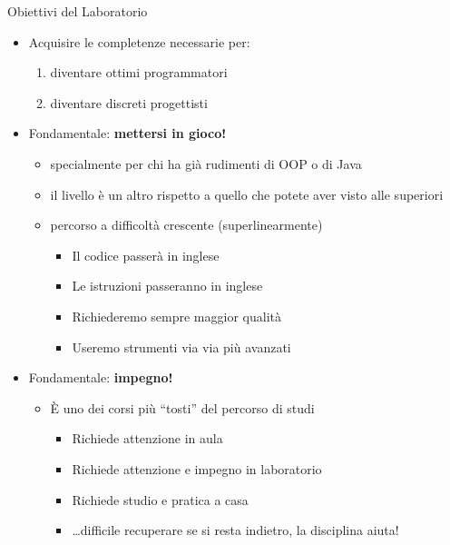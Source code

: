 \documentclass[xcolor=dvipsnames,presentation]{beamer}
\begin{document}
\begin{frame}{Obiettivi del Laboratorio}
    \begin{itemize}
        \item Acquisire le completenze necessarie per:
        \begin{enumerate}
            \item diventare ottimi programmatori
            \item diventare discreti progettisti
        \end{enumerate}
        \item Fondamentale: \textbf{mettersi in gioco!}
        \begin{itemize}
            \item specialmente per chi ha già rudimenti di OOP o di Java
            \item il livello è un altro rispetto a quello che potete aver visto alle superiori
            \item percorso a difficoltà crescente (superlinearmente)
            \begin{itemize}
                \item Il codice passerà in inglese
                \item Le istruzioni passeranno in inglese
                \item Richiederemo sempre maggior qualità
                \item Useremo strumenti via via più avanzati
            \end{itemize}
        \end{itemize}
        \item Fondamentale: \textbf{impegno!}
        \begin{itemize}
            \item È uno dei corsi più ``tosti'' del percorso di studi
            \begin{itemize}
                \item Richiede attenzione in aula
                \item Richiede attenzione e impegno in laboratorio
                \item Richiede studio e pratica a casa
                \item \dots{}difficile recuperare se si resta indietro, la disciplina aiuta!
            \end{itemize}
        \end{itemize}
    \end{itemize}
\end{frame}
\end{document}
